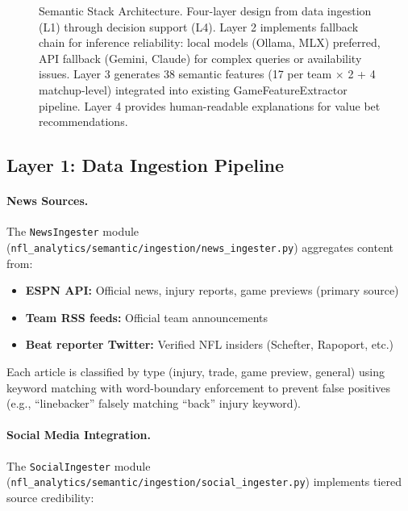\begin{figure}[htbp]
\caption{Semantic Stack Architecture. Four-layer design from data ingestion (L1) through decision support (L4). Layer 2 implements fallback chain for inference reliability: local models (Ollama, MLX) preferred, API fallback (Gemini, Claude) for complex queries or availability issues. Layer 3 generates 38 semantic features (17 per team $\times$ 2 + 4 matchup-level) integrated into existing GameFeatureExtractor pipeline. Layer 4 provides human-readable explanations for value bet recommendations.}
\label{fig:semantic-stack-architecture}
\end{figure}

\subsection{Layer 1: Data Ingestion Pipeline}

\paragraph{News Sources.}
The \texttt{NewsIngester} module (\texttt{nfl\_analytics/semantic/\allowbreak ingestion/\allowbreak news\_ingester.py}) aggregates content from:

\begin{itemize}[itemsep=2pt,parsep=0pt]
    \item \textbf{ESPN API:} Official news, injury reports, game previews (primary source)
    \item \textbf{Team RSS feeds:} Official team announcements
    \item \textbf{Beat reporter Twitter:} Verified NFL insiders (Schefter, Rapoport, etc.)
\end{itemize}

Each article is classified by type (injury, trade, game preview, general) using keyword matching with word-boundary enforcement to prevent false positives (e.g., ``linebacker'' falsely matching ``back'' injury keyword).

\paragraph{Social Media Integration.}
The \texttt{SocialIngester} module (\texttt{nfl\_analytics/semantic/\allowbreak ingestion/\allowbreak social\_ingester.py}) implements tiered source credibility:

